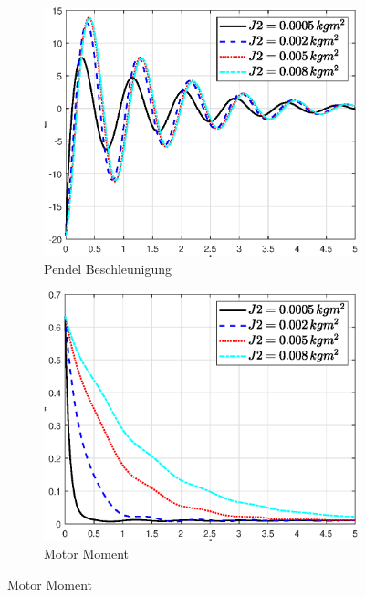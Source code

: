 \begin{figure}
\begin{subfigure}[b]{0.49 \linewidth}
    \end{subfigure}
    \begin{subfigure}[b]{0.49 \linewidth}
        \includegraphics[width=\linewidth]{Bilder/5_sensi/fig/j2/theta_punkt_punkt.eps}
        \caption{Pendel Beschleunigung}
        \label{fig:j2_theta_punkt_punkt}
    \end{subfigure}
    \begin{subfigure}[b]{0.49\linewidth}
        \includegraphics[width=\linewidth]{Bilder/5_sensi/fig/j2/tau.eps}
        \caption{Motor Moment}
        \label{fig:j2_tau}
    \end{subfigure}

\end{figure}
